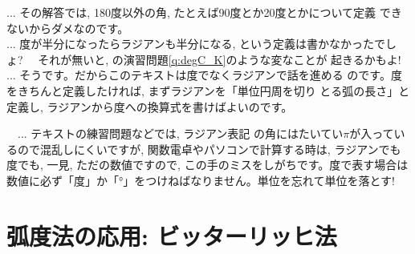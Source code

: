 \begin{faq}{\small{}
... その解答では, 180度以外の角, たとえば90度とか20度とかについて定義
できないからダメなのです。\\
... 度が半分になったらラジアンも半分になる, という定義は書かなかったでしょ?　
それが無いと, の演習問題\ref{q:degC_K}のような変なことが
起きるかもよ!\\
... そうです。だからこのテキストは度でなくラジアンで話を進める
のです。度をきちんと定義したければ, まずラジアンを「単位円周を切り
とる弧の長さ」と定義し, ラジアンから度への換算式を書けばよいのです。}\end{faq}

\begin{freqmiss}{\small{}　... テキストの練習問題などでは, ラジアン表記
の角にはたいてい$\pi$が入っているので混乱しにくいですが, 
関数電卓やパソコンで計算する時は, ラジアンでも度でも, 一見, 
ただの数値ですので, この手のミスをしがちです。度で表す場合は
数値に必ず「度」か「°」をつけねばなりません。単位を忘れて単位を落とす!}\end{freqmiss}
\hv


\section{弧度法の応用: ビッターリッヒ法}


